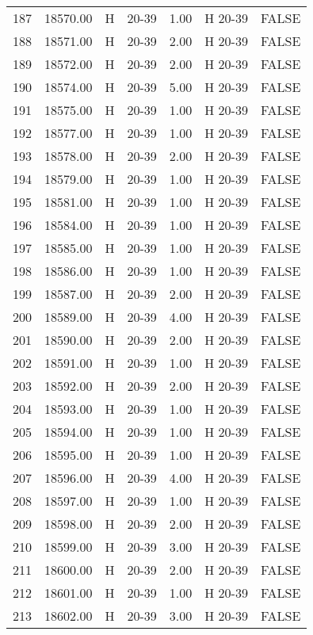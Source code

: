\begin{table}[ht]
\begin{tabular}{rrllrll}
  187 & 18570.00 & H & 20-39 & 1.00 & H 20-39 & FALSE \\ 
  188 & 18571.00 & H & 20-39 & 2.00 & H 20-39 & FALSE \\ 
  189 & 18572.00 & H & 20-39 & 2.00 & H 20-39 & FALSE \\ 
  190 & 18574.00 & H & 20-39 & 5.00 & H 20-39 & FALSE \\ 
  191 & 18575.00 & H & 20-39 & 1.00 & H 20-39 & FALSE \\ 
  192 & 18577.00 & H & 20-39 & 1.00 & H 20-39 & FALSE \\ 
  193 & 18578.00 & H & 20-39 & 2.00 & H 20-39 & FALSE \\ 
  194 & 18579.00 & H & 20-39 & 1.00 & H 20-39 & FALSE \\ 
  195 & 18581.00 & H & 20-39 & 1.00 & H 20-39 & FALSE \\ 
  196 & 18584.00 & H & 20-39 & 1.00 & H 20-39 & FALSE \\ 
  197 & 18585.00 & H & 20-39 & 1.00 & H 20-39 & FALSE \\ 
  198 & 18586.00 & H & 20-39 & 1.00 & H 20-39 & FALSE \\ 
  199 & 18587.00 & H & 20-39 & 2.00 & H 20-39 & FALSE \\ 
  200 & 18589.00 & H & 20-39 & 4.00 & H 20-39 & FALSE \\ 
  201 & 18590.00 & H & 20-39 & 2.00 & H 20-39 & FALSE \\ 
  202 & 18591.00 & H & 20-39 & 1.00 & H 20-39 & FALSE \\ 
  203 & 18592.00 & H & 20-39 & 2.00 & H 20-39 & FALSE \\ 
  204 & 18593.00 & H & 20-39 & 1.00 & H 20-39 & FALSE \\ 
  205 & 18594.00 & H & 20-39 & 1.00 & H 20-39 & FALSE \\ 
  206 & 18595.00 & H & 20-39 & 1.00 & H 20-39 & FALSE \\ 
  207 & 18596.00 & H & 20-39 & 4.00 & H 20-39 & FALSE \\ 
  208 & 18597.00 & H & 20-39 & 1.00 & H 20-39 & FALSE \\ 
  209 & 18598.00 & H & 20-39 & 2.00 & H 20-39 & FALSE \\ 
  210 & 18599.00 & H & 20-39 & 3.00 & H 20-39 & FALSE \\ 
  211 & 18600.00 & H & 20-39 & 2.00 & H 20-39 & FALSE \\ 
  212 & 18601.00 & H & 20-39 & 1.00 & H 20-39 & FALSE \\ 
  213 & 18602.00 & H & 20-39 & 3.00 & H 20-39 & FALSE \\ 

\end{tabular}
\end{table}
